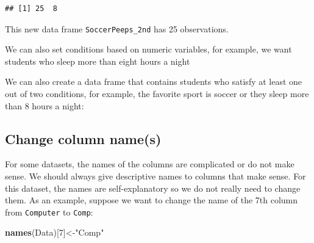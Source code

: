 \documentclass[
]{book}
\newenvironment{Shaded}{\begin{snugshade}}{\end{snugshade}}
\newcommand{\DecValTok}[1]{\textcolor[rgb]{0.00,0.00,0.81}{#1}}
\newcommand{\FunctionTok}[1]{\textcolor[rgb]{0.13,0.29,0.53}{\textbf{#1}}}
\newcommand{\NormalTok}[1]{#1}
\newcommand{\OtherTok}[1]{\textcolor[rgb]{0.56,0.35,0.01}{#1}}
\newcommand{\SpecialCharTok}[1]{\textcolor[rgb]{0.81,0.36,0.00}{\textbf{#1}}}
\newcommand{\StringTok}[1]{\textcolor[rgb]{0.31,0.60,0.02}{#1}}
\begin{document}
\begin{verbatim}
## [1] 25  8
\end{verbatim}

This new data frame \texttt{SoccerPeeps\_2nd} has 25 observations.

We can also set conditions based on numeric variables, for example, we want students who sleep more than eight hours a night

\begin{Shaded}
\end{Shaded}

We can also create a data frame that contains students who satisfy at least one out of two conditions, for example, the favorite sport is soccer or they sleep more than 8 hours a night:

\begin{Shaded}
\end{Shaded}

\hypertarget{change-column-names}{%
\subsection{Change column name(s)}\label{change-column-names}}

For some datasets, the names of the columns are complicated or do not make sense. We should always give descriptive names to columns that make sense. For this dataset, the names are self-explanatory so we do not really need to change them. As an example, suppose we want to change the name of the 7th column from \texttt{Computer} to \texttt{Comp}:

\begin{Shaded}
\begin{Highlighting}[]
\FunctionTok{names}\NormalTok{(Data)[}\DecValTok{7}\NormalTok{]}\OtherTok{\textless{}{-}}\StringTok{"Comp"}
\end{Highlighting}
\end{Shaded}
\end{document}
